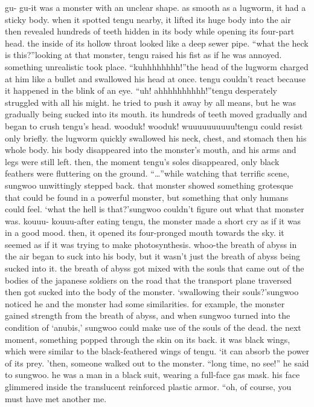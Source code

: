 gu- gu-it was a monster with an unclear shape.
 as smooth as a lugworm, it had a sticky body.
when it spotted tengu nearby, it lifted its huge body into the air then revealed hundreds of teeth hidden in its body while opening its four-part head.
 the inside of its hollow throat looked like a deep sewer pipe.
“what the heck is this?”looking at that monster, tengu raised his fist as if he was annoyed.
 something unrealistic took place.
“kuhhhhhhhh!”the head of the lugworm charged at him like a bullet and swallowed his head at once.
 tengu couldn’t react because it happened in the blink of an eye.
“uh! ahhhhhhhhhh!”tengu desperately struggled with all his might.
 he tried to push it away by all means, but he was gradually being sucked into its mouth.
 its hundreds of teeth moved gradually and began to crush tengu’s head.
wooduk! wooduk! wuuuuuuuuuu!tengu could resist only briefly.
 the lugworm quickly swallowed his neck, chest, and stomach then his whole body.
his body disappeared into the monster’s mouth, and his arms and legs were still left.
 then, the moment tengu’s soles disappeared, only black feathers were fluttering on the ground.
“…”while watching that terrific scene, sungwoo unwittingly stepped back.
that monster showed something grotesque that could be found in a powerful monster, but something that only humans could feel.
‘what the hell is that?’sungwoo couldn’t figure out what that monster was.
kouuu- kouuu-after eating tengu, the monster made a short cry as if it was in a good mood.
 then, it opened its four-pronged mouth towards the sky.
 it seemed as if it was trying to make photosynthesis.
whoo-the breath of abyss in the air began to suck into his body, but it wasn’t just the breath of abyss being sucked into it.
 the breath of abyss got mixed with the souls that came out of the bodies of the japanese soldiers on the road that the transport plane traversed then got sucked into the body of the monster.
‘swallowing their souls?’sungwoo noticed he and the monster had some similarities.
 for example, the monster gained strength from the breath of abyss, and when sungwoo turned into the condition of ‘anubis,’ sungwoo could make use of the souls of the dead.
the next moment, something popped through the skin on its back.
it was black wings, which were similar to the black-feathered wings of tengu.
‘it can absorb the power of its prey.
’then, someone walked out to the monster.
“long time, no see!” he said to sungwoo.
he was a man in a black suit, wearing a full-face gas mask.
 his face glimmered inside the translucent reinforced plastic armor.
“oh, of course, you must have met another me.
